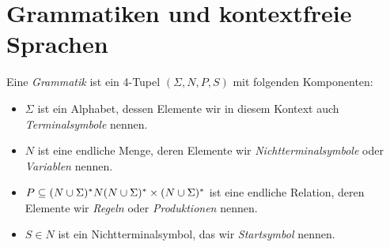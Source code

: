\section{Grammatiken und kontextfreie Sprachen}

\begin{Def}
	Eine \emph{Grammatik} ist ein 4-Tupel $(\Sigma,N,P,S)$ mit folgenden Komponenten:
	\begin{itemize}
	\item $\Sigma$ ist ein Alphabet, dessen Elemente wir in diesem Kontext auch \emph{Terminalsymbole} nennen.
	\item $N$ ist eine endliche Menge, deren Elemente wir \emph{Nichtterminalsymbole} oder \emph{Variablen} nennen.
	\item $P\subseteq (N\cup\Sigma)^*N(N\cup\Sigma)^* \times (N\cup\Sigma)^*$ ist eine endliche Relation, 
	deren Elemente wir \emph{Regeln} oder \emph{Produktionen} nennen.
	\item $S\in N$ ist ein Nichtterminalsymbol, das wir \emph{Startsymbol} nennen.
	\qedhere
	\end{itemize}
\end{Def}

